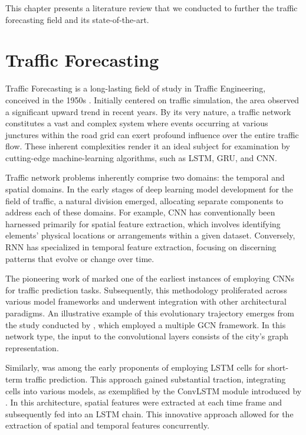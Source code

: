 This chapter presents a literature review that we conducted to further the traffic forecasting field and its state-of-the-art.

\section{Traffic Forecasting} \label{sec:trafficforecasting}

Traffic Forecasting is a long-lasting field of study in Traffic Engineering, conceived in the 1950s \cite{Beckmann1956, Bevis1959}. Initially centered on traffic simulation, the area observed a significant upward trend in recent years. By its very nature, a traffic network constitutes a vast and complex system where events occurring at various junctures within the road grid can exert profound influence over the entire traffic flow. These inherent complexities render it an ideal subject for examination by cutting-edge machine-learning algorithms, such as \gls{LSTM}, \gls{GRU}, and \gls{CNN}.

Traffic network problems inherently comprise two domains: the temporal and spatial domains. In the early stages of deep learning model development for the field of traffic, a natural division emerged, allocating separate components to address each of these domains. For example, \gls{CNN} has conventionally been harnessed primarily for spatial feature extraction, which involves identifying elements' physical locations or arrangements within a given dataset. Conversely, \gls{RNN} has specialized in temporal feature extraction, focusing on discerning patterns that evolve or change over time.

The pioneering work of \cite{Ma2017} marked one of the earliest instances of employing \gls{CNN}s for traffic prediction tasks. Subsequently, this methodology proliferated across various model frameworks and underwent integration with other architectural paradigms. An illustrative example of this evolutionary trajectory emerges from the study conducted by \cite{Lin2021}, which employed a multiple \gls{GCN} framework. In this network type, the input to the convolutional layers consists of the city's graph representation.

Similarly, \cite{Zhao2017} was among the early proponents of employing \gls{LSTM} cells for short-term traffic prediction. This approach gained substantial traction, integrating cells into various models, as exemplified by the \gls{ConvLSTM} module introduced by \cite{yao2018deep}. In this architecture, spatial features were extracted at each time frame and subsequently fed into an \gls{LSTM} chain. This innovative approach allowed for the extraction of spatial and temporal features concurrently.

